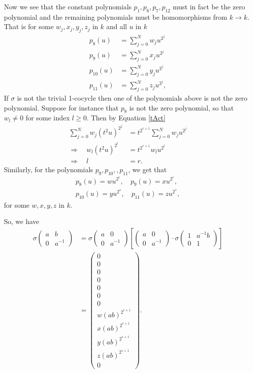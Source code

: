 Now we see that the constant polynomials $p_1,p_6,p_7,p_{12}$ must in fact be the zero polynomial and the remaining polynomials must be homomorphisms from $k\rightarrow k$. That is for some $w_j, x_j, y_j, z_j$ in $k$ and all $u$ in $k$
\begin{align*}
p_8(u) &= \sum_{j=0}^N w_j u^{2^j} \\
p_9(u) &= \sum_{j=0}^N x_j u^{2^j} \\
p_{10}(u) &= \sum_{j=0}^N y_j u^{2^j} \\
p_{11}(u) &= \sum_{j=0}^N z_j u^{2^j}, 
\end{align*}
If $\sigma$ is not the trivial 1-cocycle then one of the polynomials above is not the zero polynomial. Suppose for instance that $p_8$ is not the zero polynomial, so that $w_l\neq 0$ for some index $l\geq 0$. Then by Equation \ref{tAct}
\begin{align*}
\sum_{j=0}^N w_j (t^2u)^{2^j} &= t^{2^{r+1}}\sum_{j=0}^N w_j u^{2^j} \\
\Rightarrow\quad w_l (t^2u)^{2^l} &= t^{2^{r+1}} w_l u^{2^l} \\
\Rightarrow\quad l &= r.
\end{align*}
Similarly, for the polynomials $p_9,p_{10},,p_{11}$, we get that
\begin{align*}
p_8(u) = wu^{2^{r}}, \quad p_9(u) = xu^{2^{r}}, \\
p_{10}(u) = yu^{2^{s}}, \quad p_{11}(u) = zu^{2^{s}},
\end{align*}
for some $w,x,y,z$ in $k$.

So, we have
\begin{align*}
\sigma\left(\begin{matrix} a & b \\ 0 & a^{-1} \end{matrix}\right) &=
\sigma\left(\begin{matrix} a & 0 \\ 0 & a^{-1} \end{matrix}\right)\left[
\left(\begin{matrix} a & 0 \\ 0 & a^{-1} \end{matrix}\right)\cdot
\sigma\left(\begin{matrix} 1 & a^{-1}b \\ 0 & 1 \end{matrix}\right) \right]\\
&=
\left( \begin{matrix}
0 \\
0 \\
0 \\
0 \\
0 \\
0 \\
0 \\
w(ab)^{2^{r+1}} \\
x(ab)^{2^{r+1}} \\
y(ab)^{2^{s+1}} \\
z(ab)^{2^{s+1}} \\
0
\end{matrix} \right).
\end{align*}

